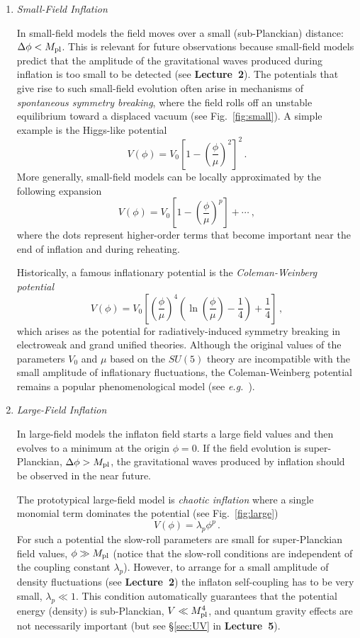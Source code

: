 \documentclass[12pt,letterpaper,rotate]{article}
\def\beq{\begin{equation}}
\def\eeq{\end{equation}}
\begin{document}
{\begin{enumerate}
\item {\it Small-Field Inflation}

In small-field models the field moves over a small (sub-Planckian) distance: $\Delta \phi < M_{\rm pl}$.
This is relevant for future observations because small-field models predict that the amplitude of the gravitational waves produced during inflation is too small to be detected (see {\bf Lecture~2}).
The potentials that give rise to such small-field evolution often arise in mechanisms of {\it spontaneous symmetry breaking}, where the field rolls off an unstable equilibrium toward a displaced vacuum (see Fig.~\ref{fig:small}). A simple example is the Higgs-like potential
\beq
V(\phi) = V_0 \left[ 1- \left(\frac{\phi}{\mu}\right)^2 \right]^2\, .
\eeq
More generally, small-field models can be locally approximated by the following expansion
\beq
V(\phi) = V_0 \left[ 1 - \left(\frac{\phi}{\mu}\right)^p\right] + \cdots \ ,
\eeq
where the dots
represent higher-order terms that become important near the end of
inflation and during reheating.

Historically, a famous inflationary potential is the {\it Coleman-Weinberg potential} \cite{Linde:1981mu, Albrecht:1982wi}
\beq
V(\phi) = V_0 \left[ \left(\frac{\phi}{\mu}\right)^4 \left( \ln \left( \frac{\phi}{\mu}\right) - \frac{1}{4}\right) + \frac{1}{4}\right]\, ,
\eeq
which arises as the potential for radiatively-induced symmetry breaking in electroweak and grand unified theories.
Although the original values of the parameters $V_0$ and $\mu$ based on the $SU(5)$ theory are incompatible with the small amplitude of inflationary fluctuations, the Coleman-Weinberg potential remains a popular phenomenological model (see {\it e.g.}~\cite{Shafi:2006cs}).

\item {\it Large-Field Inflation}

In large-field models the inflaton field starts a large field values and then evolves to a minimum at the origin $\phi=0$.  If the field evolution is super-Planckian, $\Delta \phi > M_{\rm pl}$, the gravitational waves produced by inflation should be observed in the near future.

The prototypical large-field model is {\it chaotic inflation} where a single monomial term dominates the potential (see Fig.~\ref{fig:large})
\beq
V(\phi) = \lambda_p \phi^p\, .
\eeq
For such a potential the slow-roll parameters are small for super-Planckian field values, $
\phi \gg M_{\rm pl}$ (notice that the slow-roll conditions are independent of the coupling constant $\lambda_p$). However, to arrange for a small amplitude of density fluctuations (see {\bf Lecture~2}) the inflaton self-coupling has to be very small, $\lambda_p \ll 1$. This condition automatically guarantees that the potential energy (density) is sub-Planckian, $V \ll M_{\rm pl}^4$, and quantum gravity effects are not necessarily important (but see \S\ref{sec:UV} in {\bf Lecture~5}).


\end{enumerate}}
\end{document}
